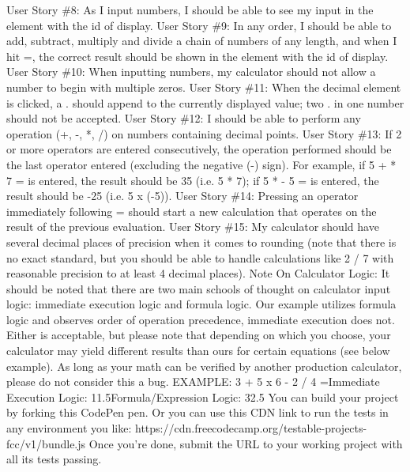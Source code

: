\documentclass{article}%
\begin{document}
User Story \#8: As I input numbers, I should be able to see my input in the element with the id of display.\newline%
User Story \#9: In any order, I should be able to add, subtract, multiply and divide a chain of numbers of any length, and when I hit =, the correct result should be shown in the element with the id of display.\newline%
User Story \#10: When inputting numbers, my calculator should not allow a number to begin with multiple zeros.\newline%
User Story \#11: When the decimal element is clicked, a . should append to the currently displayed value; two . in one number should not be accepted.\newline%
User Story \#12: I should be able to perform any operation (+, {-}, *, /) on numbers containing decimal points.\newline%
User Story \#13: If 2 or more operators are entered consecutively, the operation performed should be the last operator entered (excluding the negative ({-}) sign). For example, if 5 + * 7 = is entered, the result should be 35 (i.e. 5 * 7); if 5 * {-} 5 = is entered, the result should be {-}25 (i.e. 5 x ({-}5)).\newline%
User Story \#14: Pressing an operator immediately following = should start a new calculation that operates on the result of the previous evaluation.\newline%
User Story \#15: My calculator should have several decimal places of precision when it comes to rounding (note that there is no exact standard, but you should be able to handle calculations like 2 / 7 with reasonable precision to at least 4 decimal places).\newline%
Note On Calculator Logic: It should be noted that there are two main schools of thought on calculator input logic: immediate execution logic and formula logic. Our example utilizes formula logic and observes order of operation precedence, immediate execution does not. Either is acceptable, but please note that depending on which you choose, your calculator may yield different results than ours for certain equations (see below example). As long as your math can be verified by another production calculator, please do not consider this a bug.\newline%
EXAMPLE: 3 + 5 x 6 {-} 2 / 4 =Immediate Execution Logic: 11.5Formula/Expression Logic: 32.5\newline%
You can build your project by forking this CodePen pen. Or you can use this CDN link to run the tests in any environment you like: https://cdn.freecodecamp.org/testable{-}projects{-}fcc/v1/bundle.js\newline%
Once you're done, submit the URL to your working project with all its tests passing.\newline%
\end{document}
